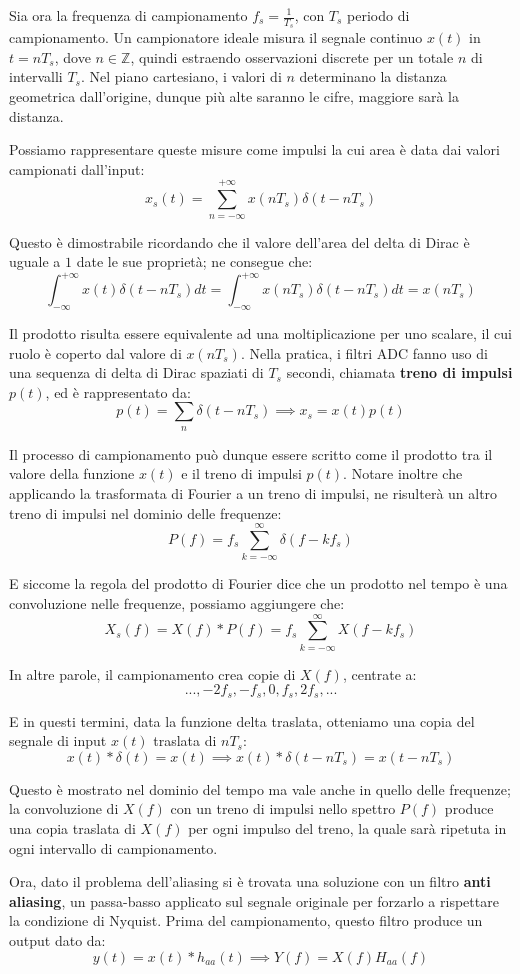 \noindent Sia ora la frequenza di campionamento $f_s = \frac{1}{T_s}$, con $T_s$ periodo di campionamento. Un campionatore ideale misura il segnale
continuo $x(t)$ in $t = nT_s$, dove $n\in \mathbb{Z}$, quindi estraendo osservazioni discrete per un totale $n$ di intervalli $T_s$. Nel piano
cartesiano, i valori di $n$ determinano la distanza geometrica dall'origine, dunque più alte saranno le cifre, maggiore sarà la distanza.\par
Possiamo rappresentare queste misure come impulsi la cui area è data dai valori campionati dall'input: \[
	x_s(t) = \sum_{n = -\infty}^{+\infty} x(nT_s)\delta(t - nT_s)
\]

\noindent Questo è dimostrabile ricordando che il valore dell'area del delta di Dirac è uguale a $1$ date le sue proprietà; ne consegue che: \[
	\int_{-\infty}^{+\infty} x(t)\delta(t - nT_s) dt =
		\int_{-\infty}^{+\infty} x(nT_s) \delta(t - nT_s) dt = x(nT_s)
\] 

\noindent Il prodotto risulta essere equivalente ad una moltiplicazione per uno scalare, il cui ruolo è coperto dal valore di $x(nT_s)$. Nella pratica,
i filtri ADC fanno uso di una sequenza di delta di Dirac spaziati di $T_s$ secondi, chiamata \textbf{treno di impulsi} $p(t)$, ed è rappresentato da: \[
	p(t) = \sum_n \delta(t - nT_s) \implies x_s = x(t)p(t)
\]

\noindent Il processo di campionamento può dunque essere scritto come il prodotto tra il valore della funzione $x(t)$ e il treno di impulsi $p(t)$.
Notare inoltre che applicando la trasformata di Fourier a un treno di impulsi, ne risulterà un altro treno di impulsi nel dominio delle frequenze: \[
	P(f) = f_s \sum_{k = -\infty}^{\infty} \delta(f - kf_s)
\]

\noindent E siccome la regola del prodotto di Fourier dice che un prodotto nel tempo è una convoluzione nelle frequenze, possiamo aggiungere che: \[
	X_s(f) = X(f) * P(f) = f_s \sum_{k = -\infty}^{\infty} X(f - kf_s)
\]

\noindent In altre parole, il campionamento crea copie di $X(f)$, centrate a: \[
	..., -2f_s, -f_s, 0, f_s, 2f_s, ...
\]

\noindent E in questi termini, data la funzione delta traslata, otteniamo una copia del segnale di input $x(t)$ traslata di $nT_s$: \[
	x(t) * \delta(t) = x(t) \implies x(t) * \delta(t - nT_s) = x(t - nT_s)
\]

\noindent Questo è mostrato nel dominio del tempo ma vale anche in quello delle frequenze; la convoluzione di $X(f)$ con un treno di impulsi nello
spettro $P(f)$ produce una copia traslata di $X(f)$ per ogni impulso del treno, la quale sarà ripetuta in ogni intervallo di campionamento.\par
Ora, dato il problema dell'aliasing si è trovata una soluzione con un filtro \textbf{anti aliasing}, un passa-basso applicato sul segnale originale per
forzarlo a rispettare la condizione di Nyquist. Prima del campionamento, questo filtro produce un output dato da: \[
	y(t) = x(t) * h_{aa}(t) \implies Y(f) = X(f)H_{aa}(f)
\]

